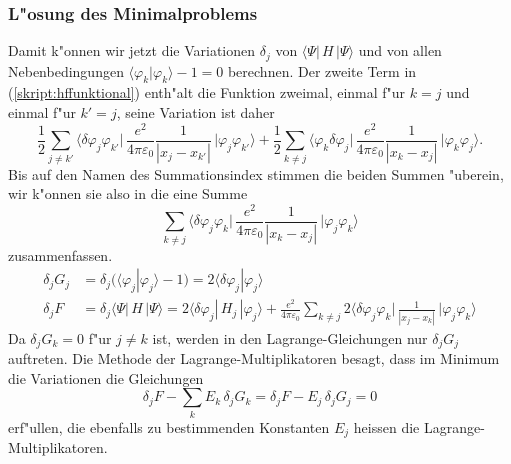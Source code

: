 \subsubsection{L"osung des Minimalproblems}
Damit k"onnen wir jetzt die Variationen $\delta_j$
von $\langle\Psi|\,H\,|\Psi\rangle$
und von allen Nebenbedingungen $\langle\varphi_k|\varphi_k\rangle-1=0$
berechnen.
Der zweite Term in (\ref{skript:hffunktional}) enth"alt die Funktion
zweimal, einmal f"ur $k=j$ und einmal f"ur $k'=j$, seine Variation
ist daher
\begin{equation*}
\frac12\sum_{j\ne k'}
\biggl\langle\delta\varphi_j\varphi_{k'}\biggl|\,
\frac{e^2}{4\pi\varepsilon_0}
\frac{1}{|x_j-x_{k'}|}
\,\biggr|\varphi_j\varphi_{k'}\biggr\rangle
+
\frac12\sum_{k\ne j}
\biggl\langle\varphi_k\delta\varphi_j\biggl|\,
\frac{e^2}{4\pi\varepsilon_0}
\frac{1}{|x_k-x_j|}
\,\biggr|\varphi_k\varphi_j\biggr\rangle.
\end{equation*}
Bis auf den Namen des Summationsindex stimmen die beiden
Summen "uberein, wir k"onnen sie also in die eine Summe
\begin{equation*}
\sum_{k\ne j}
\biggl\langle\delta\varphi_j\varphi_k\biggl|\,
\frac{e^2}{4\pi\varepsilon_0}
\frac{1}{|x_k-x_j|}
\,\biggr|\varphi_j\varphi_k\biggr\rangle
\end{equation*}
zusammenfassen.
\begin{align}
\delta_j G_j
&=
\delta_j(\langle\varphi_j|\varphi_j\rangle-1)
=
2\langle\delta\varphi_j|\varphi_j\rangle
\label{skript:variationGj}
\\
\delta_j F
&=
\delta_j\langle\Psi|\,H\,|\Psi\rangle
=
2 \langle\delta\varphi_j|\,H_j\,|\varphi_j\rangle
+
\frac{e^2}{4\pi\varepsilon_0}
\sum_{k\ne j}
2
\biggl\langle\delta\varphi_j\varphi_k\biggl|\,
\frac{1}{|x_j-x_k|}
\,\biggr|\varphi_j\varphi_k \biggr\rangle
\label{skript:variationF}
\end{align}
Da $\delta_jG_k=0$ f"ur $j\ne k$ ist, werden in den Lagrange-Gleichungen
nur $\delta_jG_j$ auftreten.
Die Methode der Lagrange-Multiplikatoren besagt, dass im Minimum
die Variationen die Gleichungen
\begin{equation}
\delta_j F - \sum_{k} E_k\, \delta_j G_k
=
\delta_j F -  E_j\, \delta_j G_j
=
0
\label{skript:lagrangeequation}
\end{equation}
erf"ullen, die ebenfalls zu bestimmenden Konstanten $E_j$ heissen 
die Lagrange-Multiplikatoren.

